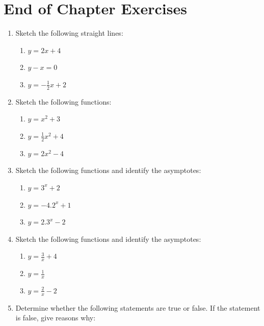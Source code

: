 \section{ End of Chapter Exercises}
\nopagebreak
\label{m39348*id253432}\begin{enumerate}[noitemsep, label=\textbf{\arabic*}. ] 
\label{m39348*uid405}\item Sketch the following straight lines: 
\label{m39348*id254512}\begin{enumerate}[noitemsep, label=\textbf{\alph*}. ] 
\item 
$y=2x+4$ \item 
$y-x=0$ \item  
$y=-\frac{1}{2}x+2$\end{enumerate}
\label{m39348*uid406}\item Sketch the following functions: 
\label{m39348*id254513}\begin{enumerate}[noitemsep, label=\textbf{\alph*}. ] 
\item 
$y={x}^{2}+3$ \item 
$y=\frac{1}{2}{x}^{2}+4$\item 
$y=2{x}^{2}-4$\end{enumerate}
\label{m39348*uid407}\item Sketch the following functions and identify the asymptotes: 
\label{m39348*id254514}\begin{enumerate}[noitemsep, label=\textbf{\alph*}. ] 
\item 
$y={3}^{x}+2$ \item 
$y=-4.{2}^{x}+1$ \item 
$y=2.{3}^{x}-2$ \end{enumerate}
\label{m39348*uid408}\item Sketch the following functions and identify the asymptotes: 
\label{m39348*id254515}\begin{enumerate}[noitemsep, label=\textbf{\alph*}. ] 
\item 
$y=\frac{3}{x}+4$ \item 
$y=\frac{1}{x}$ \item 
$y=\frac{2}{x}-2$ \end{enumerate}
\label{m39348*uid409}\item Determine whether the following statements are true or false. If the statement is false, give reasons why:
\label{m39348*id254516}\begin{enumerate}[noitemsep, label=\textbf{\alph*}. ] 

\end{enumerate}
\end{enumerate}
